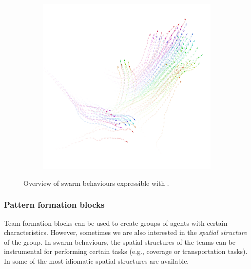 \begin{figure}[t]
\begin{subfigure}{0.32\textwidth}
  \caption{}
  \label{coordination2023-macro:fig:obstacle-avoidance}
\end{subfigure}
~
\begin{subfigure}{0.32\textwidth}
  \centering
  {\includegraphics[width=\textwidth]{papers/coordination2023-macro/images/flock.png}}
  \caption{}
  \label{coordination2023-macro:fig:flock}
\end{subfigure}
\caption{Overview of swarm behaviours expressible with \MacroSwarm{}.}\label{coordination2023-macro:fig:movement-overview}
\end{figure}

\subsubsection{Pattern formation blocks}\label{coordination2023-macro:subsec:pattern}
Team formation blocks can be used to create groups of agents with certain characteristics.
%
However, sometimes we are also interested in the \emph{spatial structure} of the group. 
%
In swarm behaviours, the spatial structures of the teams can be instrumental for performing certain tasks (e.g., coverage or transportation tasks).
% 
In \MacroSwarm{} some of the most idiomatic spatial structures are available. 
%

